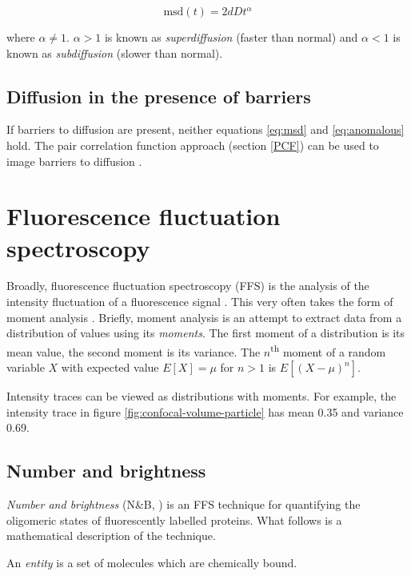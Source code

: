 \documentclass[12pt,]{book}
\theoremstyle{definition}
\theoremstyle{definition}
\theoremstyle{definition}
\theoremstyle{remark}
\let\BeginKnitrBlock\begin \let\EndKnitrBlock\end
\begin{document}
\begin{equation}
\text{msd}(t) = 2dDt^\alpha
\label{eq:anomalous}
\end{equation}

where \(\alpha \neq 1\). \(\alpha > 1\) is known as
\emph{superdiffusion} (faster than normal) and \(\alpha < 1\) is known
as \emph{subdiffusion} (slower than normal).

\subsection{Diffusion in the presence of
barriers}\label{diffusion-in-the-presence-of-barriers}

If barriers to diffusion are present, neither equations \eqref{eq:msd} and
\eqref{eq:anomalous} hold. The pair correlation function approach (section
\ref{PCF}) can be used to image barriers to diffusion \citep{PCF}.

\section{Fluorescence fluctuation spectroscopy}\label{FFS}

Broadly, fluorescence fluctuation spectroscopy (FFS) is the analysis of
the intensity fluctuation of a fluorescence signal \citep{FFS}. This
very often takes the form of moment analysis \citep{QianElson}. Briefly,
moment analysis is an attempt to extract data from a distribution of
values using its \emph{moments}. The first moment of a distribution is
its mean value, the second moment is its variance. The
\(n\)\textsuperscript{th} moment of a random variable \(X\) with
expected value \(E[X]=\mu\) for \(n>1\) is \(E[(X - \mu)^n]\).

Intensity traces can be viewed as distributions with moments. For
example, the intensity trace in figure
\ref{fig:confocal-volume-particle} has mean 0.35 and variance 0.69.

\subsection{Number and brightness}\label{number-and-brightness}

\emph{Number and brightness} (N\&B, \citet{NB}) is an FFS technique for
quantifying the oligomeric states of fluorescently labelled proteins.
What follows is a mathematical description of the technique.

\BeginKnitrBlock{definition}
\protect\hypertarget{def:unnamed-chunk-13}{}{\label{def:unnamed-chunk-13}
}An \emph{entity} is a set of molecules which are chemically bound.
\EndKnitrBlock{definition}
\end{document}
